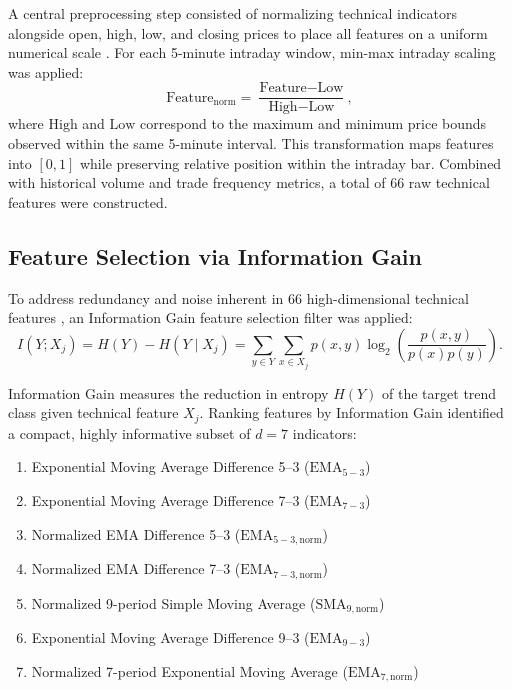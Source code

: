 A central preprocessing step consisted of normalizing technical indicators alongside open, high, low, and closing prices to place all features on a uniform numerical scale \cite{singh2022feature}. For each 5-minute intraday window, min-max intraday scaling was applied:
\begin{equation}\label{eq:minmax}
    \text{Feature}_{\text{norm}} = \frac{\text{Feature} - \text{Low}}{\text{High} - \text{Low}},
\end{equation}
where $\text{High}$ and $\text{Low}$ correspond to the maximum and minimum price bounds observed within the same 5-minute interval. This transformation maps features into $[0, 1]$ while preserving relative position within the intraday bar. Combined with historical volume and trade frequency metrics, a total of 66 raw technical features were constructed.

\subsection{Feature Selection via Information Gain}\label{sec:feature_selection}

To address redundancy and noise inherent in 66 high-dimensional technical features \cite{souza2025iccsa, lei2012feature}, an Information Gain feature selection filter was applied:
\begin{equation}\label{eq:infogain}
    I(Y; X_j) = H(Y) - H(Y \mid X_j) = \sum_{y \in Y} \sum_{x \in X_j} p(x, y) \log_2 \left( \frac{p(x, y)}{p(x) p(y)} \right).
\end{equation}

Information Gain measures the reduction in entropy $H(Y)$ of the target trend class given technical feature $X_j$. Ranking features by Information Gain identified a compact, highly informative subset of $d=7$ indicators:
\begin{enumerate}
    \item Exponential Moving Average Difference 5--3 ($\text{EMA}_{5-3}$)
    \item Exponential Moving Average Difference 7--3 ($\text{EMA}_{7-3}$)
    \item Normalized EMA Difference 5--3 ($\text{EMA}_{5-3,\text{norm}}$)
    \item Normalized EMA Difference 7--3 ($\text{EMA}_{7-3,\text{norm}}$)
    \item Normalized 9-period Simple Moving Average ($\text{SMA}_{9,\text{norm}}$)
    \item Exponential Moving Average Difference 9--3 ($\text{EMA}_{9-3}$)
    \item Normalized 7-period Exponential Moving Average ($\text{EMA}_{7,\text{norm}}$)
\end{enumerate}

